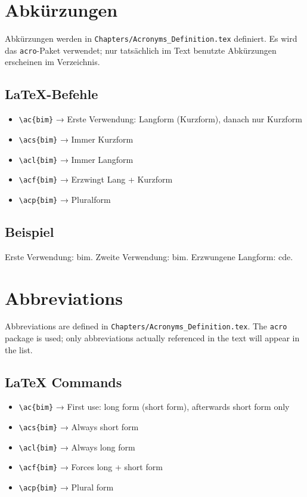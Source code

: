   \section{Abkürzungen}
  Abkürzungen werden in \texttt{Chapters/Acronyms\_Definition.tex} definiert. Es wird das \texttt{acro}-Paket verwendet; nur tatsächlich im Text benutzte Abkürzungen erscheinen im Verzeichnis.

  \subsection{LaTeX-Befehle}
  \begin{itemize}
    \item \verb|\ac{bim}| → Erste Verwendung: Langform (Kurzform), danach nur Kurzform
    \item \verb|\acs{bim}| → Immer Kurzform
    \item \verb|\acl{bim}| → Immer Langform
    \item \verb|\acf{bim}| → Erzwingt Lang + Kurzform
    \item \verb|\acp{bim}| → Pluralform
  \end{itemize}

  \subsection{Beispiel}
  Erste Verwendung: \ac{bim}. Zweite Verwendung: \ac{bim}. Erzwungene Langform: \acf{cde}.

\else
  \section{Abbreviations}
  Abbreviations are defined in \texttt{Chapters/Acronyms\_Definition.tex}. The \texttt{acro} package is used; only abbreviations actually referenced in the text will appear in the list.

  \subsection{LaTeX Commands}
  \begin{itemize}
    \item \verb|\ac{bim}| → First use: long form (short form), afterwards short form only
    \item \verb|\acs{bim}| → Always short form
    \item \verb|\acl{bim}| → Always long form
    \item \verb|\acf{bim}| → Forces long + short form
    \item \verb|\acp{bim}| → Plural form
  \end{itemize}

